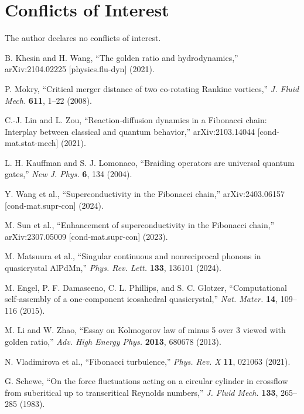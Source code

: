 \documentclass[11pt]{article}
\theoremstyle{remark}
\theoremstyle{definition}
\begin{document}
\section*{Conflicts of Interest}
The author declares no conflicts of interest.

\begin{thebibliography}{99}

B. Khesin and H. Wang,
``The golden ratio and hydrodynamics,''
arXiv:2104.02225 [physics.flu-dyn] (2021).

P. Mokry,
``Critical merger distance of two co-rotating Rankine vortices,''
\emph{J. Fluid Mech.} \textbf{611}, 1--22 (2008).

C.-J. Lin and L. Zou,
``Reaction-diffusion dynamics in a Fibonacci chain: Interplay between classical and quantum behavior,''
arXiv:2103.14044 [cond-mat.stat-mech] (2021).

L. H. Kauffman and S. J. Lomonaco,
``Braiding operators are universal quantum gates,''
\emph{New J. Phys.} \textbf{6}, 134 (2004).

Y. Wang et al.,
``Superconductivity in the Fibonacci chain,''
arXiv:2403.06157 [cond-mat.supr-con] (2024).

M. Sun et al.,
``Enhancement of superconductivity in the Fibonacci chain,''
arXiv:2307.05009 [cond-mat.supr-con] (2023).

M. Matsuura et al.,
``Singular continuous and nonreciprocal phonons in quasicrystal AlPdMn,''
\emph{Phys. Rev. Lett.} \textbf{133}, 136101 (2024).

M. Engel, P. F. Damasceno, C. L. Phillips, and S. C. Glotzer,
``Computational self-assembly of a one-component icosahedral quasicrystal,''
\emph{Nat. Mater.} \textbf{14}, 109--116 (2015).

M. Li and W. Zhao,
``Essay on Kolmogorov law of minus 5 over 3 viewed with golden ratio,''
\emph{Adv. High Energy Phys.} \textbf{2013}, 680678 (2013).

N. Vladimirova et al.,
``Fibonacci turbulence,''
\emph{Phys. Rev. X} \textbf{11}, 021063 (2021).

G. Schewe,
``On the force fluctuations acting on a circular cylinder in crossflow from subcritical up to transcritical Reynolds numbers,''
\emph{J. Fluid Mech.} \textbf{133}, 265--285 (1983).

\end{thebibliography}
\end{document}
